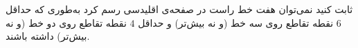 \EXERCISE
ثابت کنید نمی‌توان هفت خط راست در صفحه‌ی اقلیدسی رسم کرد به‌طوری که حداقل
$6$
نقطه تقاطع روی سه خط (و نه بیش‌تر) و حداقل
$4$
نقطه تقاطع روی دو خط (و نه بیش‌تر) داشته باشند.